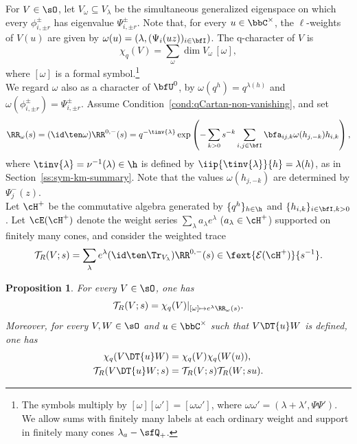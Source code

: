 \documentclass[reqno]{amsart}
\numberwithin{equation}{section}
\newtheorem*{proposition}{Proposition}
\begin{document}
For $V\in\sO$, let
$V_\omega\subseteq V_\lambda$ be the simultaneous generalized
eigenspace on which every $\phi_{i,\pm r}^\pm$ has eigenvalue
$\Psi_{i,\pm r}^\pm$. Note that, for every $u\in\bbC^\times$, the $\ell$-weights 
of $V(u)$ are given by $\omega(u)=(\lambda,(\Psi_i(uz))_{i\in\bfI})$.
The q-character of $V$ is
\begin{equation}\label{eq:q-character-definition}
\chi_q(V)=\sum_\omega\dim V_\omega\,[\omega],
\end{equation}
where $[\omega]$ is a formal symbol.\footnote{
The symbols multiply by $[\omega][\omega']=[\omega\omega']$, where
$\omega\omega'=(\lambda+\lambda',\Psi\Psi')$.
We allow sums with finitely many labels at each ordinary weight
and support in finitely many cones $\lambda_a-\sfQ_+$.
}\\

We regard $\omega$ also as a character of
$\bfU^0$, by $\omega(q^h)=q^{\lambda(h)}$ and
$\omega(\phi_{i,\pm r}^\pm)=\Psi_{i,\pm r}^\pm$.
Assume Condition~\ref{cond:qCartan-non-vanishing}, and set
\begin{equation}\label{eq:bulk-character-substitution}
\RR_\omega(s)=(\id\ten\omega)\RR^{0,-}(s)
=q^{-\tinv{\lambda}}
\exp\left(-\sum_{k>0}s^{-k}\sum_{i,j\in\bfI}
\bfa_{ij,k}\omega(h_{j,-k})h_{i,k}\right),
\end{equation}
where $\tinv{\lambda}=\nu^{-1}(\lambda)\in\h$ is defined by
$\iip{\tinv{\lambda}}{h}=\lambda(h)$, as in
Section~\ref{ss:sym-km-summary}. Note that the values $\omega(h_{j,-k})$
are determined by $\Psi_j^-(z)$.\\

Let $\cH^+$ be the commutative algebra generated by $\{q^h\}_{h\in\h}$ and $\{h_{i,k}\}_{i\in\bfI,k>0}$.
Let $\cE(\cH^+)$ denote the weight series
$\sum_\lambda a_\lambda e^\lambda$ ($a_\lambda\in\cH^+$) supported on finitely many cones, and consider the weighted trace
\begin{equation}\label{eq:bulk-weighted-trace}
\mathcal T_R(V;s)=\sum_\lambda e^\lambda
(\id\ten\Tr_{V_\lambda})\RR^{0,-}(s)
\in\fext{\mathcal E(\cH^+)}{s^{-1}}.
\end{equation}

\begin{proposition}\label{prop:bulk-trace-q-character}
For every $V\in\sO$, one has
\begin{equation}\label{eq:bulk-trace-character-identification}
	\mathcal T_R(V;s)=\chi_q(V)\vert_{[\omega]\mapsto e^\lambda\RR_\omega(s)}.
\end{equation}
Moreover, for every $V,W\in\sO$ and $u\in\bbC^\times$ such that 	
$V\DT{u}W$ is defined, one has
\begin{align}
\chi_q(V\DT{u}W)&=\chi_q(V)\chi_q(W(u)),
\label{eq:q-character-Drinfeld-product}\\
\mathcal T_R(V\DT{u}W;s)
&=\mathcal T_R(V;s)\mathcal T_R(W;su).
\label{eq:bulk-trace-Drinfeld-product}
\end{align}
\end{proposition}
\end{document}
